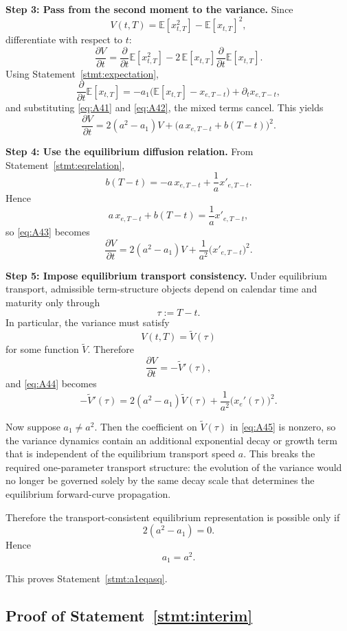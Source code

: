 \documentclass[12pt]{article}
\theoremstyle{statementstyle}
\begin{document}
\begin{appendices}
\medskip
\noindent\textbf{Step 3: Pass from the second moment to the variance.}
Since
\[
V(t,T)=\mathbb{E}[x_{t,T}^2]-\mathbb{E}[x_{t,T}]^2,
\]
differentiate with respect to \(t\):
\[
\frac{\partial V}{\partial t}
=
\frac{\partial}{\partial t}\mathbb{E}[x_{t,T}^2]
-
2\,\mathbb{E}[x_{t,T}]
\frac{\partial}{\partial t}\mathbb{E}[x_{t,T}].
\]
Using Statement~\ref{stmt:expectation},
\[
\frac{\partial}{\partial t}\mathbb{E}[x_{t,T}]
=
-a_1\bigl(\mathbb{E}[x_{t,T}]-x_{e,T-t}\bigr)
+
\partial_t x_{e,T-t},
\tag{A.4.2}\label{eq:A42}
\]
and substituting \eqref{eq:A41} and \eqref{eq:A42}, the mixed terms cancel. This yields
\[
\frac{\partial V}{\partial t}
=
2(a^2-a_1)V
+
\bigl(a\,x_{e,T-t}+b(T-t)\bigr)^2.
\tag{A.4.3}\label{eq:A43}
\]

\medskip
\noindent\textbf{Step 4: Use the equilibrium diffusion relation.}
From Statement~\ref{stmt:eqrelation},
\[
b(T-t)=-a\,x_{e,T-t}+\frac{1}{a}x'_{e,T-t}.
\]
Hence
\[
a\,x_{e,T-t}+b(T-t)=\frac{1}{a}x'_{e,T-t},
\]
so \eqref{eq:A43} becomes
\[
\frac{\partial V}{\partial t}
=
2(a^2-a_1)V
+
\frac{1}{a^2}\bigl(x'_{e,T-t}\bigr)^2.
\tag{A.4.4}\label{eq:A44}
\]

\medskip
\noindent\textbf{Step 5: Impose equilibrium transport consistency.}
Under equilibrium transport, admissible term-structure objects depend on calendar time and maturity only through
\[
\tau:=T-t.
\]
In particular, the variance must satisfy
\[
V(t,T)=\widetilde V(\tau)
\]
for some function \(\widetilde V\). Therefore
\[
\frac{\partial V}{\partial t}=-\widetilde V'(\tau),
\]
and \eqref{eq:A44} becomes
\[
-\widetilde V'(\tau)
=
2(a^2-a_1)\widetilde V(\tau)
+
\frac{1}{a^2}\bigl(x_e'(\tau)\bigr)^2.
\tag{A.4.5}\label{eq:A45}
\]

Now suppose \(a_1\neq a^2\). Then the coefficient on \(\widetilde V(\tau)\) in \eqref{eq:A45} is nonzero, so the variance dynamics contain an additional exponential decay or growth term that is independent of the equilibrium transport speed \(a\). This breaks the required one-parameter transport structure: the evolution of the variance would no longer be governed solely by the same decay scale that determines the equilibrium forward-curve propagation.

Therefore the transport-consistent equilibrium representation is possible only if
\[
2(a^2-a_1)=0.
\]
Hence
\[
a_1=a^2.
\tag{A.4.6}\label{eq:A46}
\]

This proves Statement~\ref{stmt:a1eqasq}.

\subsection{Proof of Statement~\ref{stmt:interim}}
\label{appendix:A5}


\end{appendices}
\end{document}
